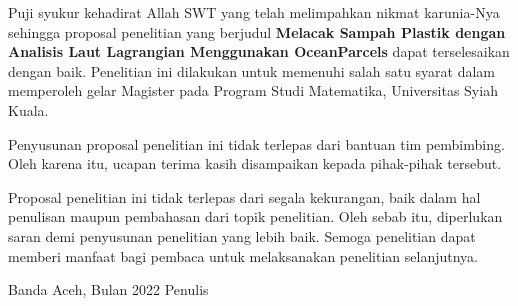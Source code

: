 \begin{spacing}{1.5}
	\pagestyle{empty}
	
	\vskip 1cm
	\par Puji syukur kehadirat Allah SWT yang telah melimpahkan nikmat karunia-Nya sehingga proposal penelitian yang berjudul \textbf{Melacak Sampah Plastik dengan Analisis Laut Lagrangian Menggunakan OceanParcels} dapat terselesaikan dengan baik. Penelitian ini dilakukan untuk memenuhi salah satu syarat dalam memperoleh gelar Magister pada Program Studi Matematika, Universitas Syiah Kuala.
	\par Penyusunan proposal penelitian ini tidak terlepas dari bantuan tim pembimbing. Oleh karena itu, ucapan terima  kasih disampaikan kepada pihak-pihak tersebut.
	\par Proposal penelitian ini tidak terlepas dari segala kekurangan, baik dalam hal penulisan maupun pembahasan dari topik penelitian. Oleh sebab itu, diperlukan saran demi penyusunan penelitian yang lebih baik. Semoga penelitian dapat memberi manfaat bagi pembaca untuk melaksanakan penelitian selanjutnya.
	\vskip 1cm  
	\begin{flushright}
		Banda Aceh, Bulan 2022
		\vskip 2cm
		Penulis	
	\end{flushright}
\end{spacing}
\pagestyle{empty}